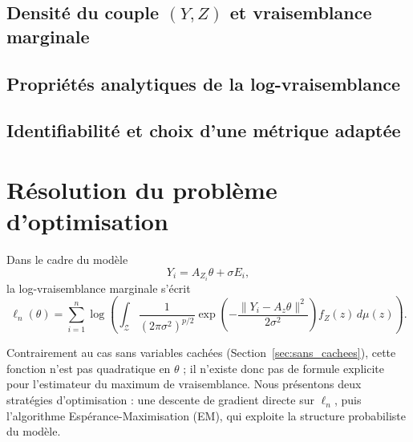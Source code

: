 \documentclass[12pt, a4paper]{article}
\theoremstyle{definition}
\begin{document}
\subsection{Densité du couple \texorpdfstring{$(Y, Z)$}{(Y,Z)} et vraisemblance marginale}
\label{subsec:densite}

\subsection{Propriétés analytiques de la log-vraisemblance}
\label{subsec:proprietes_ll}

\subsection{Identifiabilité et choix d'une métrique adaptée}
\label{subsec:identifiabilite}


\newpage
\section{Résolution du problème d'optimisation}
\label{sec:optimisation}

Dans le cadre du modèle
\[
Y_i = A_{Z_i}\theta + \sigma E_i,
\]
la log-vraisemblance marginale s'écrit
\[
\ell_n(\theta)
=
\sum_{i=1}^n
\log
\left(
\int_{\mathcal{Z}}
\frac{1}{(2\pi\sigma^2)^{p/2}}
\exp\!\left(
-\frac{\|Y_i-A_z\theta\|^2}{2\sigma^2}
\right)
f_Z(z)\,d\mu(z)
\right).
\]

Contrairement au cas sans variables cachées (Section~\ref{sec:sans_cachees}), cette fonction n'est pas quadratique en $\theta$ ; il n'existe donc pas de formule explicite pour l'estimateur du maximum de vraisemblance. Nous présentons deux stratégies d'optimisation : une descente de gradient directe sur $\ell_n$, puis l'algorithme Espérance-Maximisation (EM), qui exploite la structure probabiliste du modèle.
\end{document}
